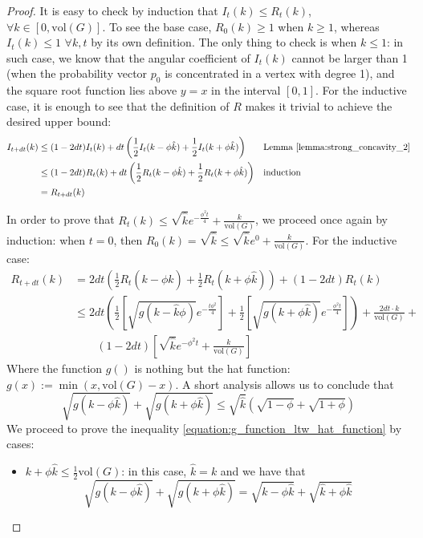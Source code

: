 \documentclass[../main.tex]{subfiles}
\begin{document}
\begin{proof}
    It is easy to check by induction that $I_t(k) \leq R_t(k)$, $\forall k \in [0, \text{vol}(G)]$.
    To see the base case, $R_0(k) \geq 1$ when $k \geq 1$, whereas $I_t(k) \leq 1$ $\forall k, t$ by its own definition. The only thing to check is when $k\leq 1$: in such case, we know that the angular coefficient of $I_t(k)$ cannot be larger than 1 (when the probability vector $p_0$ is concentrated in a vertex with degree 1), and the square root function lies above $y=x$ in the interval $[0,1]$. For the inductive case, it is enough to see that the definition of $R$ makes it trivial to achieve the desired upper bound:
    \begin{align}
        I_{t+dt}(k) & \leq (1-2dt)I_t(k) + dt\left(\frac{1}{2}I_t(k - \phi \hat{k}) + \frac{1}{2}I_t(k+\phi\hat{k})\right) && \text{Lemma \ref{lemma:strong_concavity_2}} \\
        & \leq (1-2dt)R_t(k) + dt\left(\frac{1}{2}R_t(k - \phi \hat{k}) + \frac{1}{2}R_t(k+\phi\hat{k})\right) && \text{induction} \\ 
        & = R_{t+dt}(k)
    \end{align}
    
    In order to prove that $R_t(k) \leq \sqrt{\hat{k}} e^{-\frac{\phi^2 t}{4}} + \frac{k}{\text{vol}(G)}$, we proceed once again by induction: when $t=0$, then $R_0(k) = \sqrt{\hat{k}} \leq \sqrt{\hat{k}} e^0 + \frac{k}{\text{vol}(G)}$. 
    For the inductive case:
    \begin{align}
        R_{t+dt}(k) & = 2dt\left(\frac{1}{2}R_t(k - \phi\hat{k}) + \frac{1}{2}R_t(k+\phi\hat{k})\right) + (1-2dt)R_t(k) \\ 
        &\leq 2dt \left(\frac{1}{2}\left[\sqrt{g(k - \hat{k}\phi)} e^{-\frac{t\phi^2}{4}}\right] + \frac{1}{2}\left[\sqrt{g(k + \phi\hat{k})} e^{-\frac{\phi^2 t}{4}}\right] \right) + \frac{2dt \cdot k}{\text{vol}(G)} + \nonumber \\ 
        &\qquad (1-2dt)\left[ \sqrt{\hat{k}}e^{-\phi^2 t} +\frac{k}{\text{vol}(G)} \right]
        \label{equation:r_function_inequality_to_continue}
    \end{align}
    Where the function $g()$ is nothing but the hat function: $g(x) := \min(x, \text{vol}(G) - x)$. 
    A short analysis allows us to conclude that 
    \begin{equation}
    \label{equation:g_function_ltw_hat_function}
        \sqrt{g(k - \phi \hat{k})} + \sqrt{g(k + \phi \hat{k})} \leq \sqrt{\hat{k}}\left(\sqrt{1 - \phi} + \sqrt{1 + \phi}\right)
    \end{equation}
    We proceed to prove the inequality \ref{equation:g_function_ltw_hat_function} by cases:
    \begin{itemize}
        \item $k + \phi \hat{k} \leq \frac{1}{2}\text{vol}(G)$: in this case, $\hat{k} = k$ and we have that 
        \begin{equation}
            \sqrt{g(k - \phi\hat{k})} + \sqrt{g(k + \phi\hat{k})} = \sqrt{\hat{k} - \phi\hat{k}} + \sqrt{\hat{k} + \phi\hat{k}}
        \end{equation}
        

\end{itemize}
\end{proof}
\end{document}
